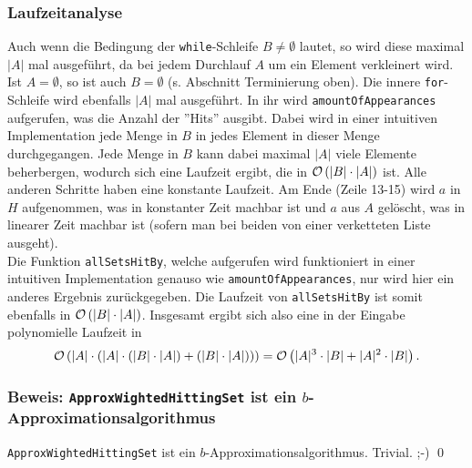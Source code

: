 \documentclass[a4paper]{article}
\begin{document}
		\subsubsection*{Laufzeitanalyse}
		Auch wenn die Bedingung der \texttt{while}-Schleife $B\neq\emptyset$ lautet, so wird diese maximal $|A|$ mal ausgeführt, da bei jedem Durchlauf $A$ um ein Element verkleinert wird.
		Ist $A=\emptyset$, so ist auch $B=\emptyset$ (s. Abschnitt Terminierung oben).\n
		Die innere \texttt{for}-Schleife wird ebenfalls $|A|$ mal ausgeführt.
		In ihr wird \texttt{amountOfAppearances} aufgerufen, was die Anzahl der ''Hits'' ausgibt.
		Dabei wird in einer intuitiven Implementation jede Menge in $B$ in jedes Element in dieser Menge durchgegangen.
		Jede Menge in $B$ kann dabei maximal $|A|$ viele Elemente beherbergen, wodurch sich eine Laufzeit ergibt, die in $\mathcal{O}\left(|B|\cdot |A|\right)$ ist.
		Alle anderen Schritte haben eine konstante Laufzeit.\n
		Am Ende (Zeile 13-15) wird $a$ in $H$ aufgenommen, was in konstanter Zeit machbar ist und $a$ aus $A$ gelöscht, was in linearer Zeit machbar ist (sofern man bei beiden von einer verketteten Liste ausgeht).\\
		Die Funktion \texttt{allSetsHitBy}, welche aufgerufen wird funktioniert in einer intuitiven Implementation genauso wie \texttt{amountOfAppearances}, nur wird hier ein anderes Ergebnis zurückgegeben. 
		Die Laufzeit von \texttt{allSetsHitBy} ist somit ebenfalls in $\mathcal{O}\left(|B|\cdot |A|\right)$.\n
		Insgesamt ergibt sich also eine in der Eingabe polynomielle Laufzeit in \[\mathcal{O}\left(|A|\cdot (|A|\cdot (|B|\cdot |A|) + (|B|\cdot |A|))\right)=\mathcal{O}\left(|A|^3\cdot |B|+|A|^2\cdot |B|\right).\]
		
		\subsubsection*{Beweis: \texttt{ApproxWightedHittingSet} ist ein $b$-Approximationsalgorithmus}
		\texttt{ApproxWightedHittingSet} ist ein $b$-Approximationsalgorithmus. Trivial. \hfill ;-) \qed
		
\end{document}
